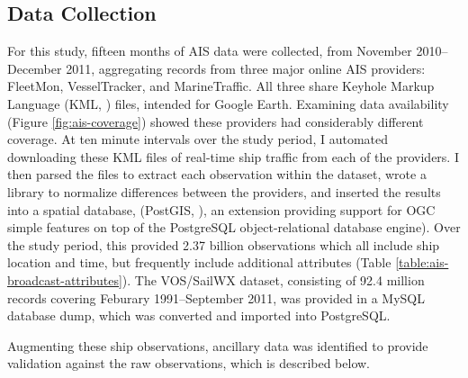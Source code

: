 \subsection{Data Collection}

For this study, fifteen months of AIS data were collected, from November 2010--December 2011, aggregating records from three major online AIS providers: FleetMon, VesselTracker, and MarineTraffic. All three share Keyhole Markup Language (KML, \citeauthor{KML}) files, intended for Google Earth. Examining data availability (Figure \ref{fig:ais-coverage}) showed these providers had considerably different coverage. At ten minute intervals over the study period, I automated downloading these KML files of real-time ship traffic from each of the providers. I then parsed the files to extract each observation within the dataset, wrote a library to normalize differences between the providers, and inserted the results into a spatial database, (PostGIS, \citeauthor{ramsey2005postgis}), an extension providing support for OGC simple features \citep{OGCSimple} on top of the PostgreSQL \citep{postgresql} object-relational database engine). Over the study period, this provided 2.37 billion observations which all include ship location and time, but frequently include additional attributes (Table \ref{table:ais-broadcast-attributes}).  The VOS/SailWX dataset, consisting of 92.4 million records covering Feburary 1991--September 2011, was provided in a MySQL database dump, which was converted and imported into PostgreSQL. 

Augmenting these ship observations, ancillary data was identified to provide validation against the raw observations, which is described below.


